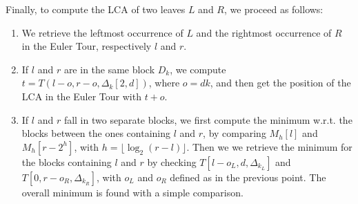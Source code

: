 Finally, to compute the LCA of two leaves $L$ and $R$, we proceed as follows:
%
\begin{enumerate}

  \item We retrieve the leftmost occurrence of $L$ and the rightmost occurrence
  of $R$ in the Euler Tour, respectively $l$ and $r$.

  \item If $l$ and $r$ are in the same block $D_k$, we compute $t = T(l - o, r -
  o, \Delta_k[2, d])$, where $o = dk$, and then get the position of the LCA in
  the Euler Tour with $t + o$.

  \item If $l$ and $r$ fall in two separate blocks, we first compute the minimum
  w.r.t. the blocks between the ones containing $l$ and $r$, by comparing
  $M_h[l]$ and $M_h[r - 2^h]$, with $h = \lfloor \log_2 (r - l)\rfloor$. Then we
  we retrieve the minimum for the blocks containing $l$ and $r$ by checking $T[l
  - o_L, d, \Delta_{k_L}]$ and $T[0, r - o_R, \Delta_{k_R}]$, with $o_L$ and
  $o_R$ defined as in the previous point. The overall minimum is found with a
  simple comparison.

\end{enumerate}
